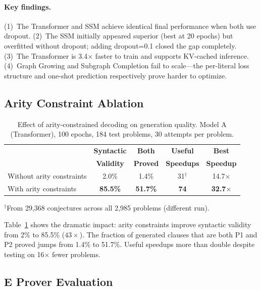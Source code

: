 \documentclass{article}
\begin{document}
\paragraph{Key findings.}
(1)~The Transformer and SSM achieve identical final performance when both use dropout.
(2)~The SSM initially appeared superior (best at 20 epochs) but overfitted without
dropout; adding dropout=0.1 closed the gap completely.
(3)~The Transformer is 3.4$\times$ faster to train and supports KV-cached inference.
(4)~Graph Growing and Subgraph Completion fail to scale---the per-literal loss
structure and one-shot prediction respectively prove harder to optimize.

\subsection{Arity Constraint Ablation}

\begin{table}[t]
\centering
\caption{Effect of arity-constrained decoding on generation quality.
Model A (Transformer), 100 epochs, 184 test problems, 30 attempts per problem.}
\label{tab:arity}
\begin{tabular}{lcccc}
\toprule
& \textbf{Syntactic} & \textbf{Both} & \textbf{Useful} & \textbf{Best} \\
& \textbf{Validity} & \textbf{Proved} & \textbf{Speedups} & \textbf{Speedup} \\
\midrule
Without arity constraints & 2.0\% & 1.4\% & 31$^\dagger$ & 14.7$\times$ \\
With arity constraints & \textbf{85.5\%} & \textbf{51.7\%} & \textbf{74} & \textbf{32.7$\times$} \\
\bottomrule
\end{tabular}
\begin{flushleft}
\scriptsize $^\dagger$From 29,368 conjectures across all 2,985 problems (different run).
\end{flushleft}
\end{table}

Table~\ref{tab:arity} shows the dramatic impact: arity constraints improve
syntactic validity from 2\% to 85.5\% ($43\times$). The fraction of
generated clauses that are both P1 and P2 proved jumps from 1.4\% to 51.7\%.
Useful speedups more than double despite testing on 16$\times$ fewer problems.

\subsection{E Prover Evaluation}
\end{document}
